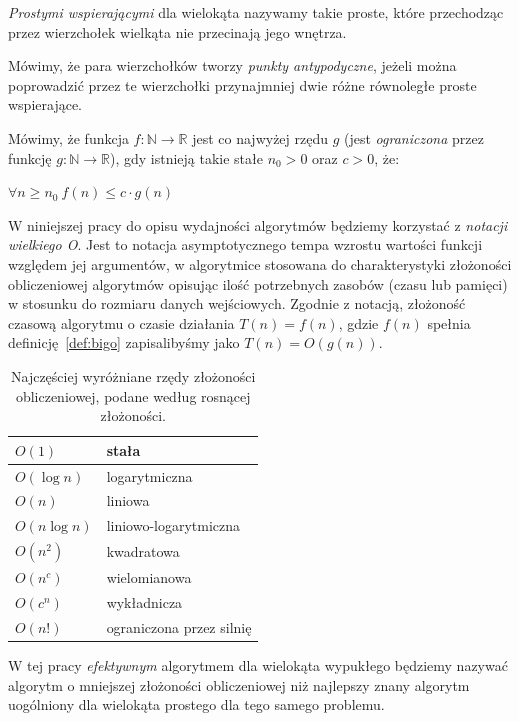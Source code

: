 \begin{definicja}
  \emph{Prostymi wspierającymi} dla wielokąta nazywamy takie proste,
  które przechodząc przez wierzchołek wielkąta nie przecinają jego
  wnętrza.
\end{definicja}

\begin{definicja}
  Mówimy, że para wierzchołków tworzy \emph{punkty antypodyczne},
  jeżeli można poprowadzić przez te wierzchołki przynajmniej dwie
  różne równoległe proste wspierające.
\end{definicja}

\begin{definicja}\label{def:bigo}
  Mówimy, że funkcja $f\colon \mathbb{N} \to \mathbb{R}$ jest co
  najwyżej rzędu $g$ (jest \emph{ograniczona} przez funkcję $g\colon
  \mathbb{N} \to \mathbb{R}$), gdy istnieją takie stałe $n_0 > 0$ oraz
  $c > 0$, że:

  \begin{center}
    $\forall n \geq n_0\ f(n) \leq c \cdot g(n)$
  \end{center}
\end{definicja}

W niniejszej pracy do opisu wydajności algorytmów będziemy korzystać z
\emph{notacji wielkiego O}. Jest to notacja asymptotycznego tempa
wzrostu wartości funkcji względem jej argumentów, w algorytmice
stosowana do charakterystyki złożoności obliczeniowej algorytmów
opisując ilość potrzebnych zasobów (czasu lub pamięci) w stosunku do
rozmiaru danych wejściowych. Zgodnie z notacją, złożoność czasową
algorytmu o czasie działania $T(n) = f(n)$, gdzie $f(n)$ spełnia
definicję~\ref{def:bigo} zapisalibyśmy jako $T(n) = O(g(n))$.

\begin{table}[htb]
  \centering

  \begin{tabular}{ll}
    \toprule
    $O(1)$ & stała \\
    \midrule
    $O(\log n)$ & logarytmiczna \\
    \midrule
    $O(n)$ & liniowa \\
    \midrule
    $O(n \log n)$ & liniowo-logarytmiczna \\
    \midrule
    $O(n^2)$ & kwadratowa \\
    \midrule
    $O(n^c)$ & wielomianowa \\
    \midrule
    $O(c^n)$ & wykładnicza \\
    \midrule
    $O(n!)$ & ograniczona przez silnię \\
    \bottomrule
  \end{tabular}

  \caption{Najczęściej wyróżniane rzędy złożoności obliczeniowej,
    podane według rosnącej złożoności.}
\end{table}

W tej pracy \emph{efektywnym} algorytmem dla wielokąta wypukłego będziemy
nazywać algorytm o mniejszej złożoności obliczeniowej niż najlepszy
znany algorytm uogólniony dla wielokąta prostego dla tego samego
problemu.


